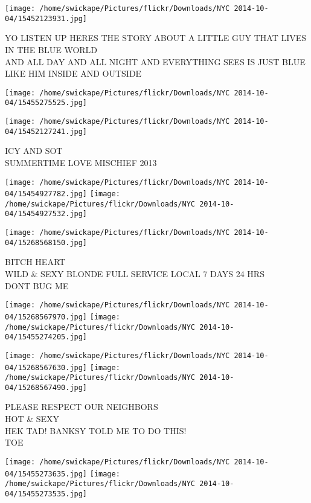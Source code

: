 \documentclass[10pt,letterpaper]{article}
\begin{document}
\vspace{0.25in}
\texttt{[image: /home/swickape/Pictures/flickr/Downloads/NYC 2014-10-04/15452123931.jpg]}

YO LISTEN UP HERES THE STORY ABOUT A LITTLE GUY THAT LIVES IN THE BLUE WORLD\\
AND ALL DAY AND ALL NIGHT AND EVERYTHING SEES IS JUST BLUE LIKE HIM INSIDE AND OUTSIDE\\
\pagebreak

\texttt{[image: /home/swickape/Pictures/flickr/Downloads/NYC 2014-10-04/15455275525.jpg]}

\vspace{0.25in}
\texttt{[image: /home/swickape/Pictures/flickr/Downloads/NYC 2014-10-04/15452127241.jpg]}

ICY AND SOT\\
SUMMERTIME LOVE MISCHIEF 2013\\
\pagebreak

\texttt{[image: /home/swickape/Pictures/flickr/Downloads/NYC 2014-10-04/15454927782.jpg]}
\texttt{[image: /home/swickape/Pictures/flickr/Downloads/NYC 2014-10-04/15454927532.jpg]}

\vspace{0.25in}
\texttt{[image: /home/swickape/Pictures/flickr/Downloads/NYC 2014-10-04/15268568150.jpg]}

BITCH HEART\\
WILD \& SEXY BLONDE FULL SERVICE LOCAL 7 DAYS 24 HRS\\
DONT BUG ME\\
\pagebreak

\texttt{[image: /home/swickape/Pictures/flickr/Downloads/NYC 2014-10-04/15268567970.jpg]}
\texttt{[image: /home/swickape/Pictures/flickr/Downloads/NYC 2014-10-04/15455274205.jpg]}

\texttt{[image: /home/swickape/Pictures/flickr/Downloads/NYC 2014-10-04/15268567630.jpg]}
\texttt{[image: /home/swickape/Pictures/flickr/Downloads/NYC 2014-10-04/15268567490.jpg]}

PLEASE RESPECT OUR NEIGHBORS\\
HOT \& SEXY\\
HEK TAD! BANKSY TOLD ME TO DO THIS!\\
TOE\\
\pagebreak

\texttt{[image: /home/swickape/Pictures/flickr/Downloads/NYC 2014-10-04/15455273635.jpg]}
\texttt{[image: /home/swickape/Pictures/flickr/Downloads/NYC 2014-10-04/15455273535.jpg]}
\end{document}
